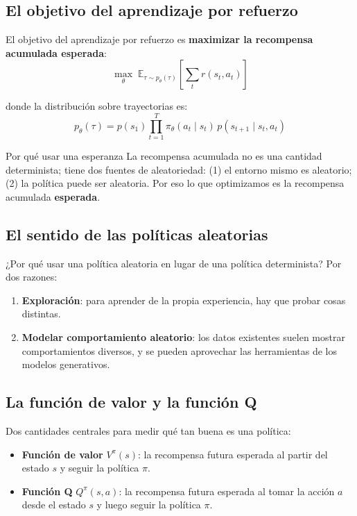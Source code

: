 \subsection{El objetivo del aprendizaje por refuerzo}

El objetivo del aprendizaje por refuerzo es \textbf{maximizar la recompensa acumulada esperada}:
$$\max_\theta \; \mathbb{E}_{\tau \sim p_\theta(\tau)} \left[ \sum_{t} r(s_t, a_t) \right]$$

donde la distribución sobre trayectorias es:
$$p_\theta(\tau) = p(s_1) \prod_{t=1}^{T} \pi_\theta(a_t \mid s_t) \, p(s_{t+1} \mid s_t, a_t)$$

\begin{warningbox}{Por qué usar una esperanza}
La recompensa acumulada no es una cantidad determinista; tiene dos fuentes de aleatoriedad: (1) el entorno mismo es aleatorio; (2) la política puede ser aleatoria. Por eso lo que optimizamos es la recompensa acumulada \textbf{esperada}.
\end{warningbox}

\subsection{El sentido de las políticas aleatorias}

¿Por qué usar una política aleatoria en lugar de una política determinista? Por dos razones:
\begin{enumerate}
    \item \textbf{Exploración}: para aprender de la propia experiencia, hay que probar cosas distintas.
    \item \textbf{Modelar comportamiento aleatorio}: los datos existentes suelen mostrar comportamientos diversos, y se pueden aprovechar las herramientas de los modelos generativos.
\end{enumerate}

\subsection{La función de valor y la función Q}

Dos cantidades centrales para medir qué tan buena es una política:

\begin{itemize}
    \item \textbf{Función de valor} $V^\pi(s)$: la recompensa futura esperada al partir del estado $s$ y seguir la política $\pi$.
    \item \textbf{Función Q} $Q^\pi(s, a)$: la recompensa futura esperada al tomar la acción $a$ desde el estado $s$ y luego seguir la política $\pi$.
\end{itemize}


